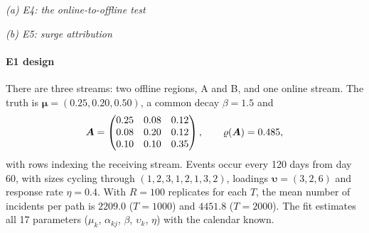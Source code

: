 \begin{table}[tbp]
\centering
\caption{Results of E4 and E5 (synthetic data). (a) E4, test of
$\alpha_{\mathrm{off},\mathrm{on}}=0$: mean estimate, rejection rates at the $5\%$ level
with the chi-bar-square and the naive $\chi^2_1$ reference, and the share of statistics
equal to zero. (b) E5, plug-in surge decomposition from the E1 fits ($T=2000$, $R=100$)
for the event with $S_e=3$, horizon $H=14$ unless marked $\infty$; stream 1 is offline
region A, stream 3 the online stream. Cov.: coverage of nominal $95\%$ intervals.}
\label{tab:sim-e4e5}
\footnotesize
\setlength{\tabcolsep}{4.5pt}
\textit{(a) E4: the online-to-offline test}\par\smallskip

\par\bigskip
\textit{(b) E5: surge attribution}\par\smallskip

\end{table}

\paragraph{E1 design} There are three streams: two offline regions, A and B, and one
online stream. The truth is $\bm\mu=(0.25,0.20,0.50)$, a common decay $\beta=1.5$ and
\[
\bm{A}=\begin{pmatrix}0.25&0.08&0.12\\0.08&0.20&0.12\\0.10&0.10&0.35\end{pmatrix},
\qquad \varrho(\bm{A})=0.485,
\]
with rows indexing the receiving stream. Events occur every 120 days from day $60$, with
sizes cycling through $(1,2,3,1,2,1,3,2)$, loadings $\bm\upsilon=(3,2,6)$ and response rate
$\eta=0.4$. With $R=100$ replicates for each $T$, the mean number of incidents per path is
$2209.0$ ($T=1000$) and $4451.8$ ($T=2000$). The fit estimates all 17 parameters ($\mu_k$,
$\alpha_{kj}$, $\beta$, $\upsilon_k$, $\eta$) with the calendar known.

